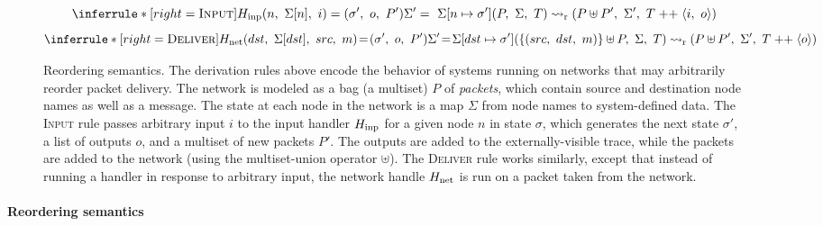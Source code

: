 \begin{figure}[t]
  \centering

  \begin{footnotesize} \begin{spacing}{1.5} \[
    \inferrule*[right=\textsc{Input}]{
      \fHinp(n,\ \Sigma[n],\ i) = (\sigma',\ o,\ P') \\
      \Sigma' =\ \Sigma[n \mapsto \sigma']
    }{
      (P,\ \Sigma,\ T) \fastep (P \uplus P',\ \Sigma',\ T \appop \traceelt{i,\ o})
    }
  \]\[
    \inferrule*[right=\textsc{Deliver}]{
      \fHnet(dst,\ \Sigma[dst],\ src,\ m)\!=\!(\sigma',\ o,\ P') \\
      \Sigma'\!=\!\Sigma[dst \mapsto \sigma']
    }{
      (\{(src,\ dst,\ m)\} \uplus P,\ \Sigma,\ T) \fastep (P \uplus P',\ \Sigma',\ T \appop \traceelt{o})
    }
  \] \end{spacing} \end{footnotesize}

  \caption{Reordering semantics.
  The derivation rules above encode the behavior of systems running on
  networks that may arbitrarily reorder packet delivery.
  The network is modeled as a bag (\ie a multiset) $P$ of \textit{packets}, which
  contain source and destination node names as well as a message.
  The state at each node in the network is a map
  $\Sigma$ from node names to system-defined data.
  The \textsc{Input} rule passes arbitrary input $i$
  to the input handler $H_{\mathrm{inp}}$ for a given node $n$ in state
  $\sigma$, which generates the next state $\sigma'$, a list of
  outputs $o$, and a multiset of new packets $P'$. The outputs are
  added to the externally-visible trace, while the packets are added
  to the network (using the multiset-union operator $\uplus$).
  The \textsc{Deliver} rule works similarly, except that instead of
  running a handler in response to arbitrary input, the network handle
  $H_{\mathrm{net}}$ is run on a packet taken from the network.
}
\label{fig:async-semantics}
\end{figure}

\paragraph{Reordering semantics}

